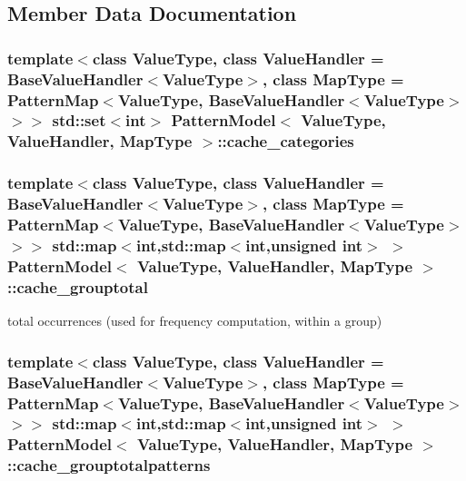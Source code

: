 \subsection{Member Data Documentation}
\hypertarget{classPatternModel_a2f9145b11bff161df5db3bcd33300319}{}
\subsubsection[{cache\+\_\+categories}]{\setlength{\rightskip}{0pt plus 5cm}template$<$class Value\+Type, class Value\+Handler = Base\+Value\+Handler$<$\+Value\+Type$>$, class Map\+Type = Pattern\+Map$<$\+Value\+Type, Base\+Value\+Handler$<$\+Value\+Type$>$$>$$>$ std\+::set$<$int$>$ {\bf Pattern\+Model}$<$ Value\+Type, Value\+Handler, Map\+Type $>$\+::cache\+\_\+categories\hspace{0.3cm}{\ttfamily [protected]}}\label{classPatternModel_a2f9145b11bff161df5db3bcd33300319}
\hypertarget{classPatternModel_a8ef56e648dc462352079542e9528df09}{}
\subsubsection[{cache\+\_\+grouptotal}]{\setlength{\rightskip}{0pt plus 5cm}template$<$class Value\+Type, class Value\+Handler = Base\+Value\+Handler$<$\+Value\+Type$>$, class Map\+Type = Pattern\+Map$<$\+Value\+Type, Base\+Value\+Handler$<$\+Value\+Type$>$$>$$>$ std\+::map$<$int,std\+::map$<$int,unsigned int$>$ $>$ {\bf Pattern\+Model}$<$ Value\+Type, Value\+Handler, Map\+Type $>$\+::cache\+\_\+grouptotal\hspace{0.3cm}{\ttfamily [protected]}}\label{classPatternModel_a8ef56e648dc462352079542e9528df09}


total occurrences (used for frequency computation, within a group) 

\hypertarget{classPatternModel_a05db7c45b9368438f34dba519df3bb3e}{}
\subsubsection[{cache\+\_\+grouptotalpatterns}]{\setlength{\rightskip}{0pt plus 5cm}template$<$class Value\+Type, class Value\+Handler = Base\+Value\+Handler$<$\+Value\+Type$>$, class Map\+Type = Pattern\+Map$<$\+Value\+Type, Base\+Value\+Handler$<$\+Value\+Type$>$$>$$>$ std\+::map$<$int,std\+::map$<$int,unsigned int$>$ $>$ {\bf Pattern\+Model}$<$ Value\+Type, Value\+Handler, Map\+Type $>$\+::cache\+\_\+grouptotalpatterns\hspace{0.3cm}{\ttfamily [protected]}}\label{classPatternModel_a05db7c45b9368438f34dba519df3bb3e}


